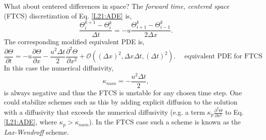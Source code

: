 What about centered differences in space? The \textit{forward time,
  centered space} (FTCS) discretization of Eq. \eqref{L21:ADE} is,
\begin{equation}
  \frac{\Theta_i^{k+1}-\Theta_i^k}{\Delta t} = -u
  \frac{\Theta_{i+1}^{k}-\Theta^k_{i-1}}{2\Delta x}.\label{L21:FTCS}
\end{equation}
The corresponding modified equivalent PDE is,
\begin{equation}
  \frac{\partial\Theta}{\partial t} = -u
  \frac{\partial\Theta}{\partial x} - \frac{u^2\Delta t}{2}\frac{\partial^2\Theta}{\partial x^2} +
  \mathcal{O}\left((\Delta x)^2,\Delta x\Delta t,(\Delta
    t)^2\right).\quad\text{ equivalent PDE for FTCS}\label{L21:FTCSepde}
\end{equation}
In this case the numerical diffusivity,
\begin{equation}
  \kappa_{num} = -\frac{u^2\Delta t}{2},
\end{equation}
is always negative and thus the FTCS is unstable for any chosen time
step. One could stabilize schemes such as this by adding explicit
diffusion to the solution with a diffusivity that exceeds the
numerical diffusivity (e.g. a term
$\kappa_p\frac{\partial^2\Theta}{\partial x^2}$ to Eq. \eqref{L21:ADE},
where $\kappa_p>\kappa_{num}$). In the FTCS case such a scheme is
known as the \textit{Lax-Wendroff} scheme.

